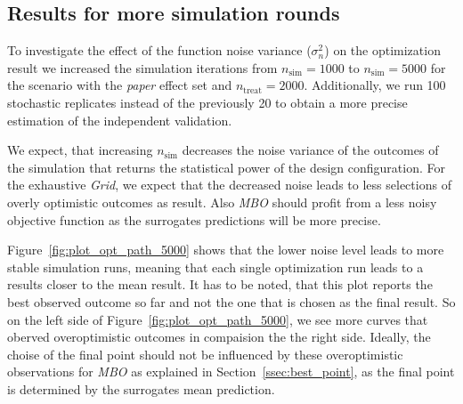 \documentclass[bimj,fleqn]{w-art}
\theoremstyle{plain}
\theoremstyle{definition}
\begin{document}
\subsection{Results for more simulation rounds}


To investigate the effect of the function noise variance ($\sigma^2_n$) on the optimization result we increased the simulation iterations from $n_\text{sim} = 1000$ to $n_\text{sim} = 5000$ for the scenario with the \emph{paper} effect set and  $n_{\text{treat}} = 2000$.
Additionally, we run 100 stochastic replicates instead of the previously 20 to obtain a more precise estimation of the independent validation.

We expect, that increasing $n_\text{sim}$ decreases the noise variance of the outcomes of the simulation that returns the statistical power of the design configuration.
For the exhaustive \emph{Grid}, we expect that the decreased noise leads to less selections of overly optimistic outcomes as result.
Also \emph{MBO} should profit from a less noisy objective function as the surrogates predictions will be more precise.

Figure~\ref{fig:plot_opt_path_5000} shows that the lower noise level leads to more stable simulation runs, meaning that each single optimization run leads to a results closer to the mean result.
It has to be noted, that this plot reports the best observed outcome so far and not the one that is chosen as the final result.
So on the left side of Figure~\ref{fig:plot_opt_path_5000}, we see more curves that oberved overoptimistic outcomes in compaision the the right side.
Ideally, the choise of the final point should not be influenced by these overoptimistic observations for \emph{MBO} as explained in Section~\ref{ssec:best_point}, as the final point is determined by the surrogates mean prediction.
\end{document}
